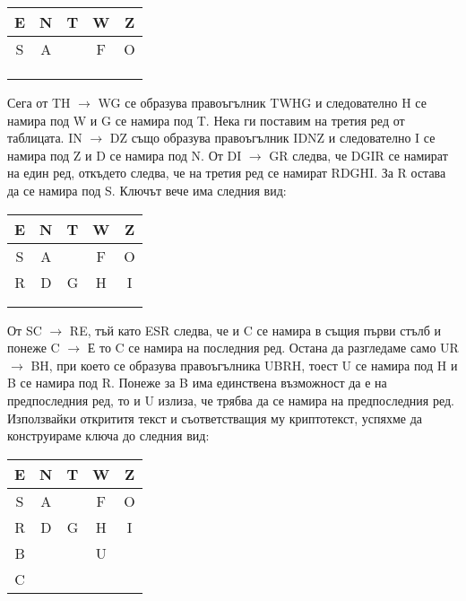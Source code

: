 \documentclass{article}
\begin{document}
\begin{center}
\begin{tabular}{|c|c|c|c|c|}
        \hline
        E & N & T & W & Z \\
        \hline
        S & A &  & F & O \\
        \hline
         &  &  &  &  \\
        \hline
         &  &  &  &  \\
        \hline
         &  &  &  &  \\
        \hline
        \end{tabular}
\end{center}

\justify
Сега от TH $\rightarrow$ WG се образува правоъгълник TWHG и следователно H се намира под W и G се намира под T. Нека ги поставим на третия ред от таблицата. IN $\rightarrow$ DZ също образува правоъгълник IDNZ и следователно I се намира под Z и D се намира под N. От DI $\rightarrow$ GR следва, че DGIR се намират на един ред, откъдето следва, че на третия ред се намират RDGHI. За R остава да се намира под S. Ключът вече има следния вид: 

\begin{center}
\begin{tabular}{|c|c|c|c|c|}
        \hline
        E & N & T & W & Z \\
        \hline
        S & A &  & F & O \\
        \hline
        R & D & G & H & I \\
        \hline
         &  &  &  &  \\
        \hline
         &  &  &  &  \\
        \hline
        \end{tabular}
\end{center}

\justify
От SC $\rightarrow$ RE, тъй като ESR следва, че и C се намира в същия първи стълб и понеже C $\rightarrow$ Е то C се намира на последния ред. Остана да разгледаме само UR $\rightarrow$ BH, при което се образува правоъгълника UBRH, тоест U се намира под H и B се намира под R. Понеже за B има единствена възможност да е на предпоследния ред, то и U излиза, че трябва да се намира на предпоследния ред. Използвайки открититя текст и съответстващия му криптотекст, успяхме да конструираме ключа до следния вид: 

\begin{center}
\begin{tabular}{|c|c|c|c|c|}
        \hline
        E & N & T & W & Z \\
        \hline
        S & A &  & F & O \\
        \hline
        R & D & G & H & I \\
        \hline
        B &  &  & U &  \\
        \hline
        C &  &  &  &  \\
        \hline
        \end{tabular}
\end{center}
\end{document}
